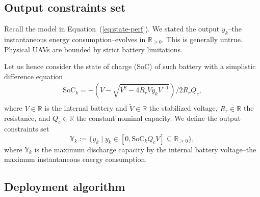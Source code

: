 \documentclass[letterpaper,10pt,conference]{ieeeconf}
\theoremstyle{definition}
\begin{document}
\subsection{Output constraints set}

Recall the model in Equation~(\ref{eq:state-perf}). We stated the output $y_k$--the instantaneous energy consumption--evolves in $\mathbb{R}_{\geq 0}$. This is generally untrue. Physical UAVs are bounded by strict battery limitations.

Let us hence consider the state of charge (SoC) of such battery with a simplistic difference equation~\cite{seewald2020mechanical}
\begin{equation}\begin{split}
  \mathrm{SoC}_k=-\left(V-
  \sqrt{
    V^2-
    4R_r\tilde{V}y_kV^{-1}}
  \right)/2R_rQ_c,\\ 
\end{split}\end{equation}
where $V\in\mathbb{R}$ is the internal battery and $\tilde{V}\in\mathbb{R}$ the stabilized voltage, $R_r\in\mathbb{R}$ the resistance, and $Q_c\in\mathbb{R}$ the constant nominal capacity. We define the output constraints set
\begin{equation}
  \mathbb{Y}_k:=\{y_k\mid y_k\in[0,\mathrm{SoC}_kQ_cV]\subseteq{\mathbb{R}_{\geq 0}}\},
\end{equation}
where $\overline{\mathbb{Y}}_k$ is the maximum discharge capacity by the internal battery voltage--the maximum instantaneous energy consumption.
\subsection{Deployment algorithm}
\end{document}
